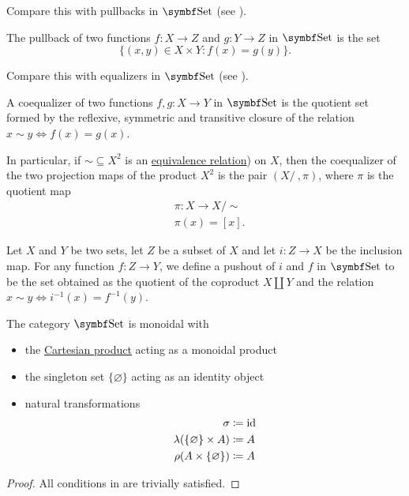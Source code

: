 \begin{Proposition}
\begin{DefEnum}
    Compare this with pullbacks in \( \Cat{Set} \) (see ).

     The pullback of two functions \( f: X \to Z \) and \( g: Y \to Z \) in \( \Cat{Set} \) is the set
    \begin{equation*}
      \{ (x, y) \in X \times Y \colon f(x) = g(y) \}.
    \end{equation*}

    Compare this with equalizers in \( \Cat{Set} \) (see ).

     A coequalizer of two functions \( f, g: X \to Y \) in \( \Cat{Set} \) is the quotient set formed by the reflexive, symmetric and transitive closure of the relation \( x \sim y \iff f(x) = g(x) \).

    In particular, if \( \sim \subseteq X^2 \) is an \hyperref[def:equivalence_relation]{equivalence relation}) on \( X \), then the coequalizer of the two projection maps of the product \( X^2 \) is the pair \( (X / ~, \pi) \), where \( \pi \) is the quotient map
    \begin{align*}
      &\pi: X \to X / \sim \\
      &\pi(x) = [x].
    \end{align*}

     Let \( X \) and \( Y \) be two sets, let \( Z \) be a subset of \( X \) and let \( i: Z \to X \) be the inclusion map. For any function \( f: Z \to Y \), we define a pushout of \( i \) and \( f \) in \( \Cat{Set} \) to be the set obtained as the quotient of the coproduct \( X \coprod Y \) and the relation \( x \sim y \iff i^{-1}(x) = f^{-1}(y) \).
  \end{DefEnum}
\end{Proposition}

\begin{Proposition}\label{thm:set_is_monoidal}
  The category \( \Cat{Set} \) is monoidal with
  \begin{itemize}
    \item the \hyperref[def:cartesian_product]{Cartesian product} acting as a monoidal product
    \item the singleton set \( \{ \varnothing \} \) acting as an identity object
    \item natural transformations
    \begin{align*}
      \sigma &\coloneqq \operatorname{id} \\
      \lambda(\{ \varnothing \} \times A) &\coloneqq A \\
      \rho(A \times \{ \varnothing \}) &\coloneqq A
    \end{align*}
  \end{itemize}
\end{Proposition}
\begin{proof}
  All conditions in  are trivially satisfied.
\end{proof}
